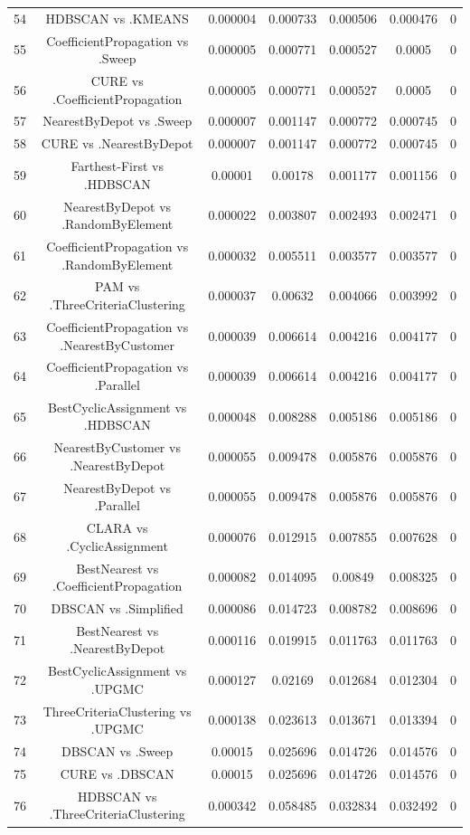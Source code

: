 \documentclass[a4paper,10pt]{article}
\begin{document}
\begin{landscape}
\begin{table}[!htp]
\begin{tabular}{ccccccc}
54&HDBSCAN vs .KMEANS&0.000004&0.000733&0.000506&0.000476&0\\
55&CoefficientPropagation vs .Sweep&0.000005&0.000771&0.000527&0.0005&0\\
56&CURE vs .CoefficientPropagation&0.000005&0.000771&0.000527&0.0005&0\\
57&NearestByDepot vs .Sweep&0.000007&0.001147&0.000772&0.000745&0\\
58&CURE vs .NearestByDepot&0.000007&0.001147&0.000772&0.000745&0\\
59&Farthest-First vs .HDBSCAN&0.00001&0.00178&0.001177&0.001156&0\\
60&NearestByDepot vs .RandomByElement&0.000022&0.003807&0.002493&0.002471&0\\
61&CoefficientPropagation vs .RandomByElement&0.000032&0.005511&0.003577&0.003577&0\\
62&PAM vs .ThreeCriteriaClustering&0.000037&0.00632&0.004066&0.003992&0\\
63&CoefficientPropagation vs .NearestByCustomer&0.000039&0.006614&0.004216&0.004177&0\\
64&CoefficientPropagation vs .Parallel&0.000039&0.006614&0.004216&0.004177&0\\
65&BestCyclicAssignment vs .HDBSCAN&0.000048&0.008288&0.005186&0.005186&0\\
66&NearestByCustomer vs .NearestByDepot&0.000055&0.009478&0.005876&0.005876&0\\
67&NearestByDepot vs .Parallel&0.000055&0.009478&0.005876&0.005876&0\\
68&CLARA vs .CyclicAssignment&0.000076&0.012915&0.007855&0.007628&0\\
69&BestNearest vs .CoefficientPropagation&0.000082&0.014095&0.00849&0.008325&0\\
70&DBSCAN vs .Simplified&0.000086&0.014723&0.008782&0.008696&0\\
71&BestNearest vs .NearestByDepot&0.000116&0.019915&0.011763&0.011763&0\\
72&BestCyclicAssignment vs .UPGMC&0.000127&0.02169&0.012684&0.012304&0\\
73&ThreeCriteriaClustering vs .UPGMC&0.000138&0.023613&0.013671&0.013394&0\\
74&DBSCAN vs .Sweep&0.00015&0.025696&0.014726&0.014576&0\\
75&CURE vs .DBSCAN&0.00015&0.025696&0.014726&0.014576&0\\
76&HDBSCAN vs .ThreeCriteriaClustering&0.000342&0.058485&0.032834&0.032492&0\\

\end{tabular}
\end{table}
\end{landscape}
\end{document}
